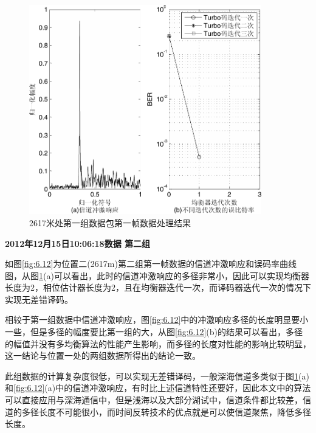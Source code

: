 \begin{figure}[htb]
  \begin{center}
    \includegraphics[width=0.9\textwidth]{images/result_2_1.pdf}
  \end{center}
  \caption{2617米处第一组数据包第一帧数据处理结果}
  \label{fig:6.11}
\end{figure}

\textbf{\sihao 2012年12月15日10:06:18数据 第二组} 

如图\ref{fig:6.12}为位置二(2617m)第二组第一帧数据的信道冲激响应和误码率曲线图，从图\ref{fig:6.11}(a)可以看出，此时的信道冲激响应的多径非常小，因此可以实现均衡器长度为2，相位估计器长度为2，且在均衡器迭代一次，而译码器迭代一次的情况下实现无差错译码。

相较于第一组数据中信道冲激响应，图\ref{fig:6.12}中的冲激响应多径的长度明显要小一些，但是多径的幅度要比第一组的大，从图\ref{fig:6.12}(b)的结果可以看出，多径的幅值并没有多均衡算法的性能产生影响，而多径的长度对性能的影响比较明显，这一结论与位置一处的两组数据所得出的结论一致。

此组数据的计算复杂度很低，可以实现无差错译码，一般深海信道多类似于图\ref{fig:6.11}(a)和\ref{fig:6.12}(a)中的信道冲激响应，有时比上述信道特性还要好，因此本文中的算法可以直接应用与深海通信中，但是浅海以及大部分湖试中，信道条件都比较差，信道的多径长度不可能很小，而时间反转技术的优点就是可以使信道聚焦，降低多径长度。

